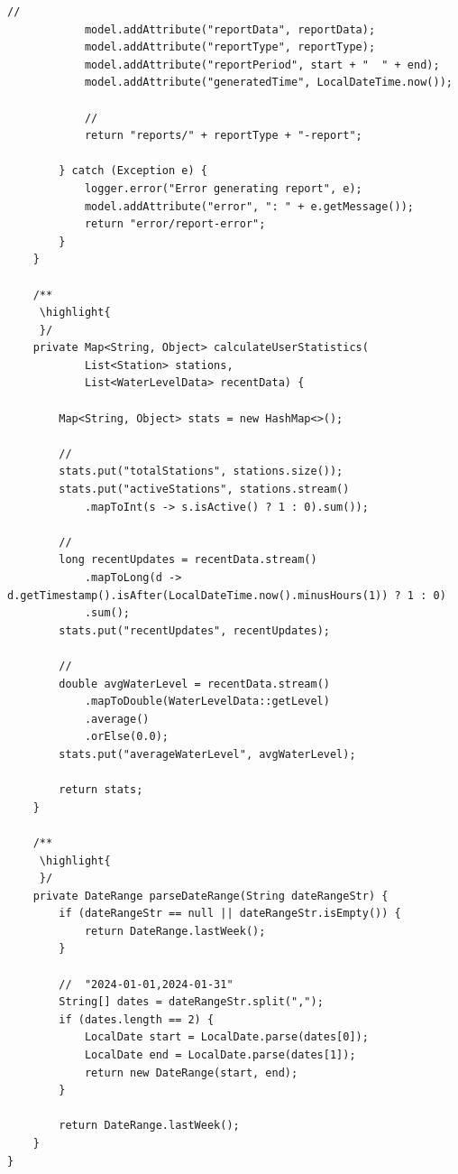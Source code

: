\begin{lstlisting}[style=java]
            // 
            model.addAttribute("reportData", reportData);
            model.addAttribute("reportType", reportType);
            model.addAttribute("reportPeriod", start + "  " + end);
            model.addAttribute("generatedTime", LocalDateTime.now());
            
            // 
            return "reports/" + reportType + "-report";
            
        } catch (Exception e) {
            logger.error("Error generating report", e);
            model.addAttribute("error", ": " + e.getMessage());
            return "error/report-error";
        }
    }
    
    /**
     \highlight{ 
     }/
    private Map<String, Object> calculateUserStatistics(
            List<Station> stations, 
            List<WaterLevelData> recentData) {
        
        Map<String, Object> stats = new HashMap<>();
        
        // 
        stats.put("totalStations", stations.size());
        stats.put("activeStations", stations.stream()
            .mapToInt(s -> s.isActive() ? 1 : 0).sum());
        
        // 
        long recentUpdates = recentData.stream()
            .mapToLong(d -> d.getTimestamp().isAfter(LocalDateTime.now().minusHours(1)) ? 1 : 0)
            .sum();
        stats.put("recentUpdates", recentUpdates);
        
        // 
        double avgWaterLevel = recentData.stream()
            .mapToDouble(WaterLevelData::getLevel)
            .average()
            .orElse(0.0);
        stats.put("averageWaterLevel", avgWaterLevel);
        
        return stats;
    }
    
    /**
     \highlight{ 
     }/
    private DateRange parseDateRange(String dateRangeStr) {
        if (dateRangeStr == null || dateRangeStr.isEmpty()) {
            return DateRange.lastWeek();
        }
        
        //  "2024-01-01,2024-01-31" 
        String[] dates = dateRangeStr.split(",");
        if (dates.length == 2) {
            LocalDate start = LocalDate.parse(dates[0]);
            LocalDate end = LocalDate.parse(dates[1]);
            return new DateRange(start, end);
        }
        
        return DateRange.lastWeek();
    }
}
\end{lstlisting}

